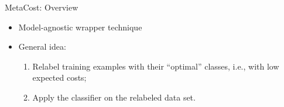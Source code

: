 \documentclass[11pt,compress,t,notes=noshow, xcolor=table]{beamer}
\begin{document}
\begin{vbframe}{MetaCost: Overview}


        \begin{itemize}
            \item Model-agnostic wrapper technique                      
            \item General idea: 
                \begin{enumerate}
                    \item Relabel training examples with their ``optimal'' classes, i.e., with low expected costs;
                   
                    \item Apply the classifier on the relabeled data set.
                \end{enumerate} 
        \end{itemize}

\end{vbframe}
\end{document}
